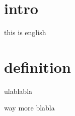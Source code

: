 \section{intro}
this is english

\section{definition}
ulablabla

\cite{petersohn2011vergleich}
way more blabla

\printbibliography%
